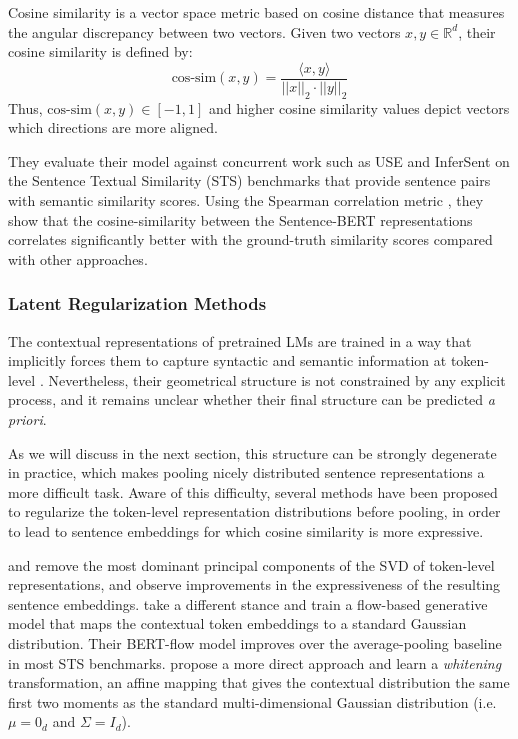 Cosine similarity is a vector space metric based on cosine distance that measures the angular discrepancy between two vectors. Given two vectors $x, y \in \mathbb{R}^d$, their cosine similarity is defined by:
$$
\text{cos-sim}(x, y) = \frac{\langle x, y \rangle}{||x||_2 \cdot ||y||_2}
$$
Thus, $\text{cos-sim}(x, y) \in [-1, 1]$ and higher cosine similarity values depict vectors which directions are more aligned.

They evaluate their model against concurrent work such as USE \citep{cer-etal-2018-universal} and InferSent \citep{conneau-etal-2017-supervised} on the Sentence Textual Similarity (STS) benchmarks that provide sentence pairs with semantic similarity scores. Using the Spearman correlation metric \citep{zar2005spearman}, they show that the cosine-similarity between the Sentence-BERT representations correlates significantly better with the ground-truth similarity scores compared with other approaches.

\subsubsection{Latent Regularization Methods}

The contextual representations of pretrained LMs are trained in a way that implicitly forces them to capture syntactic and semantic information at token-level \citep{jawahar-etal-2019-bert}. Nevertheless, their geometrical structure is not constrained by any explicit process, and it remains unclear whether their final structure can be predicted \textit{a priori}.

As we will discuss in the next section, this structure can be strongly degenerate in practice, which makes pooling nicely distributed sentence representations a more difficult task. Aware of this difficulty, several methods have been proposed to regularize the token-level representation distributions before pooling, in order to lead to sentence embeddings for which cosine similarity is more expressive.

\citet{arora2017a} and \citet{mu2018allbutthetop} remove the most dominant principal components of the SVD of token-level representations, and observe improvements in the expressiveness of the resulting sentence embeddings. \citet{li-etal-2020-sentence} take a different stance and train a flow-based generative model that maps the contextual token embeddings to a standard Gaussian distribution. Their BERT-flow model improves over the average-pooling baseline in most STS benchmarks. \citet{su2021whiteningsentencerepresentationsbetter} propose a more direct approach and learn a \textit{whitening} transformation, an affine mapping that gives the contextual distribution the same first two moments as the standard multi-dimensional Gaussian distribution (i.e. $\mu = 0_d$ and $\Sigma = I_d$).

